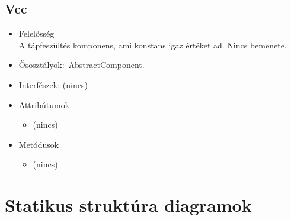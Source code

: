 \subsection{Vcc}
\begin{itemize}
\item Felelősség\\
A tápfeszültés komponens, ami konstans igaz értéket ad. Nincs bemenete.
\item Ősosztályok:\ AbstractComponent.
\item Interfészek: (nincs)
\item Attribútumok $\ $
\begin{itemize}
\item (nincs)
\end{itemize}
\item Metódusok$\ $
\begin{itemize}
\item (nincs)
\end{itemize}
\end{itemize}

\section{Statikus struktúra diagramok}

